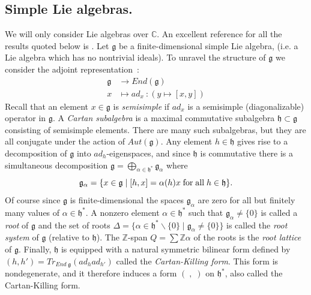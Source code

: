 \documentclass[a4paper,10pt]{amsart}
\def\Z{\mathbb{Z}}
\def\a{\alpha}
\def\C{\mathbb{C}}
\def\g{\mathfrak{g}}
\def\h{\mathfrak{h}}
\numberwithin{equation}{section}
\begin{document}
{\vspace{.25in}

\setcounter{equation}{0}
\setcounter{theo}{0}

\subsection{Simple Lie algebras.}

\vspace{.15in}

We will only consider Lie algebras over $\C$. An excellent reference for all the results quoted below is \cite{Serrecsla}.
Let $\g$ be a finite-dimensional simple Lie algebra, (i.e. a Lie algebra which has no nontrivial ideals). To unravel the structure of $\g$ we consider the adjoint representation~:
\begin{equation*}
\begin{split}
\g &\to {End}(\g)\\
 x &\mapsto ad_x~: (y \mapsto [x,y])
 \end{split}
 \end{equation*}
Recall that an element $x \in \g$ is \textit{semisimple} if $ad_x$ is a semisimple (diagonalizable) operator in $\g$. A \textit{Cartan subalgebra} is a maximal commutative subalgebra $\h \subset \g$ consisting of semisimple elements. There are many such subalgebras, but they are all conjugate under the action of ${Aut}(\g)$. Any element $h \in \h$ gives rise to a decomposition of $\g$ into $ad_h$-eigenspaces, and since $\h$ is commutative there is a simultaneous decomposition
$\g= \bigoplus_{\alpha \in \h^*} \g_{\a}$ where
$$\g_{\a}=\{ x \in \g\;|\; [h,x]=\alpha(h) x \; \text{for\;all\;} h \in \h\}.$$
Of course since $\g$ is finite-dimensional the spaces $\g_{\a}$ are zero for all but finitely many values of $\a \in \h^*$. A nonzero element $\alpha \in \h^*$ such that $\g_{\a} \neq \{0\}$ is called a \textit{root} of $\g$ and the set of roots $\Delta=\{\a \in \h^* \backslash\{0\}\;|\; \g_{\a} \neq \{0\}\}$ is called the \textit{root system} of $\g$ (relative to $\h$). The $\Z$-span $Q=\sum \Z \a$ of the roots is the \textit{root lattice} of $\g$. Finally, $\h$ is equipped with a natural symmetric bilinear form defined by $(h,h')=Tr_{{End}\;\g}(ad_h ad_{h'})$ called the \textit{Cartan-Killing form}. This form is nondegenerate, and it therefore induces a form $(\;,\;)$ on $\h^*$, also called the Cartan-Killing form.

}
\end{document}
